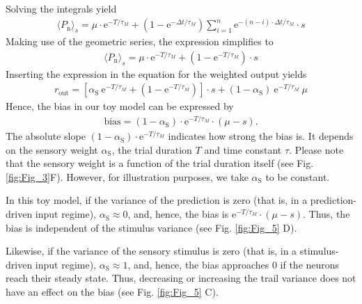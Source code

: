 \documentclass[10pt,a4paper,draft]{article}
\begin{document}
%
Solving the integrals yield
%
\begin{align}
\langle P_\mathrm{n} \rangle_s = \mu \cdot \mathrm{e}^{-T/\tau_M} + \left( 1 -   \mathrm{e}^{-\Delta t/\tau_M} \right) \sum_{i=1}^{n} \mathrm{e}^{-(n-i)\cdot \Delta t/ \tau_M} \cdot s
\end{align}
%
Making use of the geometric series, the expression simplifies to
%
\begin{align*}
\langle P_\mathrm{n} \rangle_s =  \mu \cdot \mathrm{e}^{-T/\tau_M} + \left( 1 -   \mathrm{e}^{-T/\tau_M} \right) \cdot s
\end{align*}
%
Inserting the expression in the equation for the weighted output yields
%
\begin{align*}
 r_\mathrm{out} = \left[ \alpha_\mathrm{S}\  \mathrm{e}^{-T/\tau_M} + \left( 1 -   \mathrm{e}^{-T/\tau_M} \right)\right] \cdot s + \left( 1 -\alpha_\mathrm{S} \right)\ \mathrm{e}^{-T/\tau_M}\ \mu
\end{align*}
%
Hence, the bias in our toy model can be expressed by
%
\begin{align*}
 \mathrm{bias} = \left( 1 -\alpha_\mathrm{S} \right)\cdot \mathrm{e}^{-T/\tau_M}\cdot \left(\mu - s \right).
\end{align*}
%
The absolute slope $\left( 1 -\alpha_\mathrm{S} \right)\cdot \mathrm{e}^{-T/\tau_M}$ indicates how strong the bias is. It depends on the sensory weight $\alpha_\mathrm{S}$, the trial duration $T$ and time constant $\tau$. Please note that the sensory weight is a function of the trial duration itself (see Fig. \ref{fig:Fig_3}F). However, for illustration purposes, we take $\alpha_\mathrm{S}$ to be constant.
 
In this toy model, if the variance of the prediction is zero (that is, in a prediction-driven input regime), $\alpha_\mathrm{S} \approx 0$, and, hence, the bias is $\mathrm{e}^{-T/\tau_M}\cdot \left(\mu - s \right)$. Thus, the bias is independent of the stimulus variance (see Fig. \ref{fig:Fig_5} D).

Likewise, if the variance of the sensory stimulus is zero (that is, in a stimulus-driven input regime), $\alpha_\mathrm{S} \approx 1$, and, hence, the bias approaches $0$ if the neurons reach their steady state. Thus, decreasing or increasing the trail variance does not have an effect on the bias (see Fig. \ref{fig:Fig_5} C).

\end{document}
